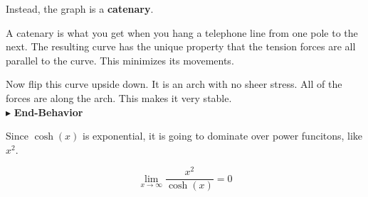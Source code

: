 \documentclass{ximera}
\begin{document}
Instead, the graph is a \textbf{catenary}.

A catenary is what you get when you hang a telephone line from one pole to the next.  The resulting curve has the unique property that the tension forces are all parallel to the curve. This minimizes its movements.

Now flip this curve upside down.  It is an arch with no sheer stress.  All of the forces are along the arch.  This makes it very stable. \\






$\blacktriangleright$ \textbf{End-Behavior}

Since $\cosh(x)$ is exponential, it is going to dominate over power funcitons, like $x^2$.

\[     \lim_{x \to \infty}\frac{x^2}{\cosh(x)} = 0     \]
\end{document}
